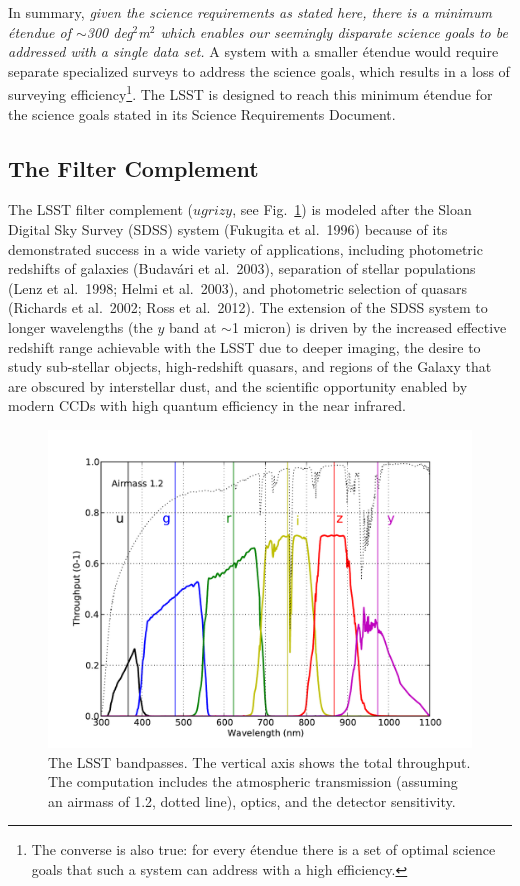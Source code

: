 In summary,
{\it given the science requirements as stated here, there is a
minimum \'etendue of $\sim$300 deg$^2$m$^2$ which enables our seemingly
disparate science goals to be addressed with a single data set.}
A system with a smaller \'etendue would require separate specialized surveys
to address the science goals, which results in a loss of surveying
efficiency\footnote{The converse is also true: for every \'etendue
there is a set of optimal science goals that such a system can
address with a high efficiency.}. The LSST is designed to reach this
minimum \'etendue for the science goals stated in its Science Requirements
Document.



\subsection{  The Filter Complement }

The LSST filter complement ($ugrizy$, see Fig.~\ref{Fig:filters}) is modeled after the Sloan
Digital Sky Survey
(SDSS) system (Fukugita et al.~1996) because of its demonstrated success in a wide
variety of applications, including photometric redshifts of galaxies (Budav\'{a}ri
et al.~2003), separation of stellar populations (Lenz et al.~1998; Helmi et al.~2003),
and photometric selection of quasars (Richards et al.~2002; Ross et al.~2012). The extension of the
SDSS system to longer wavelengths
(the $y$ band at $\sim$1 micron) is driven by the increased effective redshift
range achievable with the LSST due to deeper imaging, the desire to study sub-stellar
objects, high-redshift quasars, and regions of the Galaxy that are obscured by
interstellar dust, and
the scientific opportunity enabled by modern CCDs with high quantum efficiency
in the near infrared.


\begin{figure}
\hskip -0.13in
\includegraphics[width=1.1\hsize,clip]{filters_y4.pdf}
\caption{The LSST bandpasses. The vertical axis shows the total throughput. The computation
includes the atmospheric transmission (assuming an airmass of 1.2, %
dotted line), optics, and the detector sensitivity.}
\label{Fig:filters}
\end{figure}


